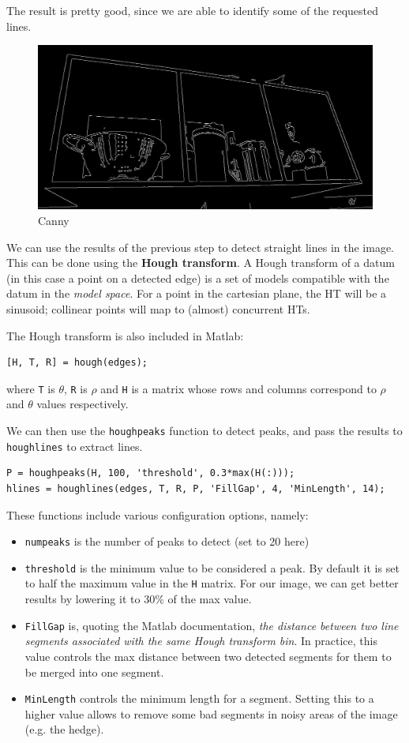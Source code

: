 The result is pretty good, since we are able to identify some of the requested lines.
\begin{figure}[H]
    \centering
    \includegraphics[width=0.75\linewidth]{img/imageProcessing/BW.jpg}
    \caption{Canny}
    \label{fig:canny}
\end{figure}

We can use the results of the previous step to detect straight lines in the image. This can be done using the \textbf{Hough transform}. A Hough transform of a datum (in this case a point on a detected edge) is a set of models compatible with the datum in the \emph{model space}.
For a point in the cartesian plane, the HT will be a sinusoid; collinear points will map to (almost) concurrent HTs.

The Hough transform is also included in Matlab:
\begin{verbatim}
[H, T, R] = hough(edges);
\end{verbatim}
where \verb|T| is $\theta$, \verb|R| is $\rho$ and \verb|H| is a matrix whose rows and columns correspond to $\rho$ and $\theta$ values respectively.

We can then use the \verb|houghpeaks| function to detect peaks, and pass the results to \verb|houghlines| to extract lines.
\begin{verbatim}
P = houghpeaks(H, 100, 'threshold', 0.3*max(H(:)));
hlines = houghlines(edges, T, R, P, 'FillGap', 4, 'MinLength', 14);
\end{verbatim}

These functions include various configuration options, namely:
\begin{itemize}
	\item \verb|numpeaks| is the number of peaks to detect (set to 20 here)
	\item \verb|threshold| is the minimum value to be considered a peak. By default it is set to half the maximum value in the \verb|H| matrix. For our image, we can get better results by lowering it to 30\% of the max value.
	\item \verb|FillGap| is, quoting the Matlab documentation, \emph{the distance between two line segments associated with the same Hough transform bin}. In practice, this value controls the max distance between two detected segments for them to be merged into one segment.
	\item \verb|MinLength| controls the minimum length for a segment. Setting this to a higher value allows to remove some bad segments in noisy areas of the image (e.g. the hedge).
\end{itemize}

